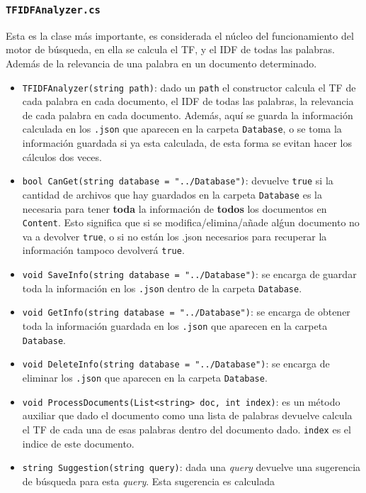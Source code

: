 \documentclass[a4paper, 12pt]{report}
\begin{document}
\subsubsection*{\tt TFIDFAnalyzer.cs}

Esta es la clase más importante, es considerada el núcleo del funcionamiento del motor de búsqueda, 
en ella se calcula el TF, y el IDF de todas las palabras. Además de la relevancia de una palabra en 
un documento determinado.

\begin{itemize}
	\item {\tt TFIDFAnalyzer(string path)}: dado un {\tt path} el constructor calcula el TF
	      de cada palabra en cada documento, el IDF de todas las palabras, la relevancia de cada
	      palabra en cada documento. Además, aquí se guarda la información calculada en los
		      {\tt .json} que aparecen en la carpeta {\tt Database}, o se toma la información guardada
	      si ya esta calculada, de esta forma se evitan hacer los cálculos dos veces.
	\item {\tt bool CanGet(string database = "../Database")}: devuelve {\tt true} si la cantidad
	      de archivos que hay guardados en la carpeta {\tt Database} es la necesaria para tener {\bf toda}
	      la información de {\bf todos} los documentos en {\tt Content}. Esto significa que si se modifica/elimina/a\~nade
	      al\'gun documento no va a devolver {\tt true}, o si no están los {.json} necesarios
	      para recuperar la información tampoco devolverá {\tt true}.
	\item {\tt void SaveInfo(string database = "../Database")}: se encarga de guardar toda la información en los {\tt .json} dentro de la carpeta {\tt Database}.
	\item {\tt void GetInfo(string database = "../Database")}: se encarga de obtener toda la información guardada en los {\tt .json} que aparecen en la carpeta {\tt Database}.
	\item {\tt void DeleteInfo(string database = "../Database")}: se encarga de eliminar los {\tt .json} que aparecen en la carpeta {\tt Database}.
	\item {\tt void ProcessDocuments(List<string> doc, int index)}: es un método auxiliar que dado el documento como una lista de palabras devuelve calcula el TF de cada una de esas
	      palabras dentro del documento dado. {\tt index} es el indice de este documento.
	\item {\tt string Suggestion(string query)}: dada una {\it query} devuelve una sugerencia de búsqueda para esta {\it query}. Esta sugerencia es calculada

\end{itemize}
\end{document}
